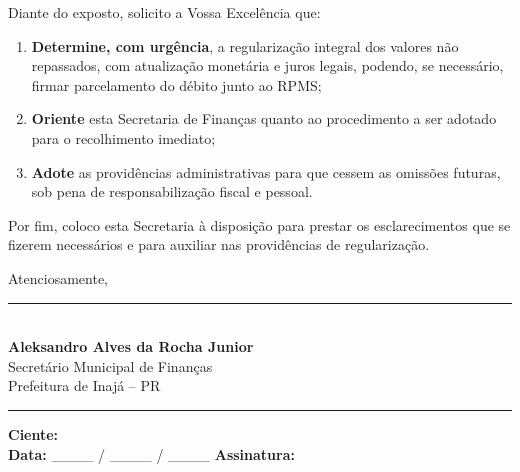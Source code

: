 \documentclass[
12pt,
a4paper,
brazil,
]{article}
\begin{document}
\vspace{0.3cm}

Diante do exposto, solicito a Vossa Excelência que:

\begin{enumerate}
  \item \textbf{Determine, com urgência}, a regularização integral dos
    valores não repassados, com atualização monetária e juros legais,
    podendo, se necessário, firmar parcelamento do débito junto ao RPMS;
  \item \textbf{Oriente} esta Secretaria de Finanças quanto ao
    procedimento a ser adotado para o recolhimento imediato;
  \item \textbf{Adote} as providências administrativas para que cessem
    as omissões futuras, sob pena de responsabilização fiscal e pessoal.
\end{enumerate}

\vspace{0.3cm}

Por fim, coloco esta Secretaria à disposição para prestar os
esclarecimentos que se fizerem necessários e para auxiliar nas
providências de regularização.

\vspace{0.6cm}

\begin{flushright}
  Atenciosamente,
\end{flushright}

\vspace{0.8cm}

\begin{center}
  \rule{0.4\textwidth}{0.5pt}\\[2pt]
  {\large\textbf{Aleksandro Alves da Rocha Junior}}\\
  Secretário Municipal de Finanças\\
  Prefeitura de Inajá -- PR
\end{center}

\vspace{0.5cm}
\hrule
\vspace{0.2cm}
{\footnotesize
  \textbf{Ciente:} \hrulefill \\
  \textbf{Data:} \_\_\_\_ / \_\_\_\_ / \_\_\_\_ \hfill
  \textbf{Assinatura:} \hrulefill
}
\end{document}
